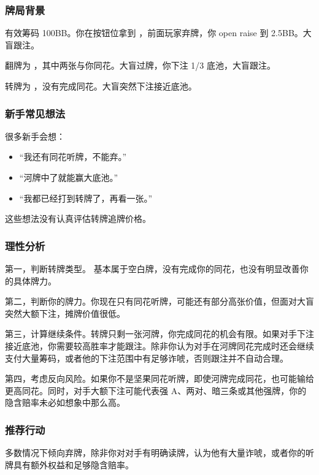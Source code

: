 \subsubsection*{牌局背景}

有效筹码 100BB。你在按钮位拿到 ，前面玩家弃牌，你 open raise 到 2.5BB。大盲跟注。

翻牌为 ，其中两张与你同花。大盲过牌，你下注 1/3 底池，大盲跟注。

转牌为 ，没有完成同花。大盲突然下注接近底池。

\subsubsection*{新手常见想法}

很多新手会想：

\begin{itemize}
\item “我还有同花听牌，不能弃。”
\item “河牌中了就能赢大底池。”
\item “我都已经打到转牌了，再看一张。”
\end{itemize}

这些想法没有认真评估转牌追牌价格。

\subsubsection*{理性分析}

第一，判断转牌类型。 基本属于空白牌，没有完成你的同花，也没有明显改善你的具体牌力。

第二，判断你的牌力。你现在只有同花听牌，可能还有部分高张价值，但面对大盲突然大额下注，摊牌价值很低。

第三，计算继续条件。转牌只剩一张河牌，你完成同花的机会有限。如果对手下注接近底池，你需要较高胜率才能跟注。除非你认为对手在河牌同花完成时还会继续支付大量筹码，或者他的下注范围中有足够诈唬，否则跟注并不自动合理。

第四，考虑反向风险。如果你不是坚果同花听牌，即使河牌完成同花，也可能输给更高同花。同时，对手大额下注可能代表强 A、两对、暗三条或其他强牌，你的隐含赔率未必如想象中那么高。

\subsubsection*{推荐行动}

多数情况下倾向弃牌，除非你对对手有明确读牌，认为他有大量诈唬，或者你的听牌具有额外权益和足够隐含赔率。

